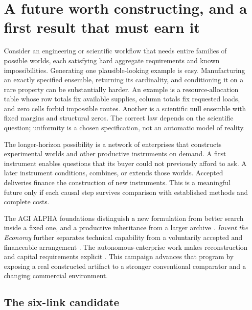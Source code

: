 \documentclass[11pt,letterpaper]{article}
\begin{document}
\setcounter{tocdepth}{1}
\begingroup
\small\setlength{\parskip}{0pt}
\makeatletter
\renewcommand{\l@section}[2]{\@dottedtocline{1}{0em}{1.8em}{#1}{#2}}
\makeatother
\tableofcontents
\endgroup
\clearpage

\section{A future worth constructing, and a first result that must earn it}

Consider an engineering or scientific workflow that needs entire families of possible
worlds, each satisfying hard aggregate requirements and known impossibilities.
Generating one plausible-looking example is easy. Manufacturing an exactly specified
ensemble, returning its cardinality, and conditioning it on a rare property can be
substantially harder. An example is a resource-allocation table whose row totals fix
available supplies, column totals fix requested loads, and zero cells forbid impossible
routes. Another is a scientific null ensemble with fixed margins and structural zeros.
The correct law depends on the scientific question; uniformity is a chosen specification,
not an automatic model of reality.

The longer-horizon possibility is a network of enterprises that constructs experimental
worlds and other productive instruments on demand. A first instrument enables questions
that its buyer could not previously afford to ask. A later instrument conditions,
combines, or extends those worlds. Accepted deliveries finance the construction of
new instruments. This is a meaningful future only if each causal step survives comparison
with established methods and complete costs.

The AGI ALPHA foundations distinguish a new formulation from better search inside a
fixed one, and a productive inheritance from a larger archive \cite{boucherTI,boucherEvolve}.
\emph{Invent the Economy} further separates technical capability from a voluntarily
accepted and financeable arrangement \cite{boucherEconomy}. The autonomous-enterprise
work makes reconstruction and capital requirements explicit \cite{boucherEnterprise}.
This campaign advances that program by exposing a real constructed artifact to a
stronger conventional comparator and a changing commercial environment.

\subsection{The six-link candidate}
\end{document}
